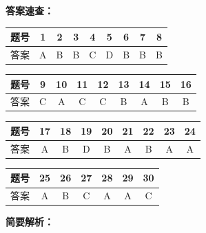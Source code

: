 \documentclass[12pt, a4paper]{article}
\begin{document}
\begin{answerbox}

\textbf{答案速查：}

\begin{center}
\begin{tabular}{|c|c|c|c|c|c|c|c|c|}
\hline
题号 & 1 & 2 & 3 & 4 & 5 & 6 & 7 & 8 \\
\hline
答案 & A & B & B & C & D & B & B & B \\
\hline
\end{tabular}

\vspace{4pt}

\begin{tabular}{|c|c|c|c|c|c|c|c|c|}
\hline
题号 & 9 & 10 & 11 & 12 & 13 & 14 & 15 & 16 \\
\hline
答案 & C & A & C & C & B & A & B & B \\
\hline
\end{tabular}

\vspace{4pt}

\begin{tabular}{|c|c|c|c|c|c|c|c|c|}
\hline
题号 & 17 & 18 & 19 & 20 & 21 & 22 & 23 & 24 \\
\hline
答案 & A & B & D & B & A & B & A & A \\
\hline
\end{tabular}

\vspace{4pt}

\begin{tabular}{|c|c|c|c|c|c|c|}
\hline
题号 & 25 & 26 & 27 & 28 & 29 & 30 \\
\hline
答案 & A & B & C & A & A & C \\
\hline
\end{tabular}
\end{center}

\vspace{8pt}
\textbf{简要解析：}


\end{answerbox}
\end{document}
